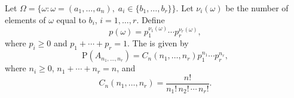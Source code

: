 Let $\Omega = \{\omega : \omega = (a_1, \ldots, a_n), \; a_i \in \{b_1, \ldots, b_r\}\}$. Let $\nu_i(\omega)$ be the number of elements of $\omega$ equal to $b_i$, $i = 1, \ldots, r$. Define
$$p(\omega) = p_1^{\nu_1(\omega)} \cdots p_r^{\nu_r(\omega)},$$
where $p_i \geq 0$ and $p_1 + \cdots + p_r = 1$. The  is given by
$$\text{P}(A_{n_1, \ldots, n_r}) = C_n(n_1, \ldots, n_r) p_1^{n_1} \cdots p_r^{n_r},$$
where $n_i \geq 0$, $n_1 + \cdots + n_r = n$, and
$$C_n(n_1, \ldots, n_r) = \frac{n!}{n_1! \, n_2! \, \cdots \, n_r!}.$$
